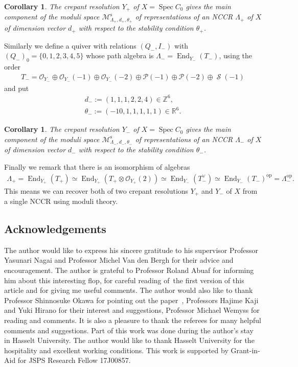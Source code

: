 \documentclass[10pt,a4paper]{amsart}
\DeclareMathOperator{\End}{End}
\DeclareMathOperator{\Spi}{\mathcal{S}}
\DeclareMathOperator{\Spec}{Spec}
\newcommand{\stsh}{\mathcal{O}}
\numberwithin{equation}{section}
\newtheorem{Corollary}[Theorem]{Corollary}
\begin{document}
\begin{Corollary}
The crepant resolution $Y_+$ of $X = \Spec C_0$ gives the main component of the moduli space $\mathcal{M}_{\Lambda_+, d_+, \theta_+}^{\mathrm{s}}$
of representations of an NCCR $\Lambda_+$ of $X$ of dimension vector $d_+$ with respect to the stability condition $\theta_+$.
\end{Corollary}

Similarly we define a quiver with relations $(Q_-, I_-)$ with $(Q_-)_0 = \{0,1,2,3,4,5\}$
whose path algebra is $\Lambda_- = \End_{Y_-}(T_-)$,
using the order
\begin{gather*}
T_- = \stsh_{Y_-} \oplus \stsh_{Y_-}(-1) \oplus \stsh_{Y_-}(-2) \oplus \mathcal{P}(-1) \oplus \mathcal{P}(-2) \oplus \Spi(-1)
\end{gather*}
and put
\begin{gather*}
d_- := (1,1,1,2 , 2, 4) \in \mathbb{Z}^{6}, \\
\theta_- := (-10, 1,1,1,1,1) \in \mathbb{R}^{6}.
\end{gather*}

\begin{Corollary}
The crepant resolution $Y_-$ of $X = \Spec C_0$ gives the main component of the moduli space $\mathcal{M}_{\Lambda_-, d_-, \theta_-}^{\mathrm{s}}$
of representations of an NCCR $\Lambda_-$ of $X$ of dimension vector $d_-$ with respect to the stability condition $\theta_-$.
\end{Corollary}

Finally we remark that there is an isomorphism of algebras
\begin{align*}
\Lambda_+ = \End_{Y_+}(T_+) \simeq \End_{Y_+}(T_+ \otimes \stsh_{Y_+}(2)) \simeq \End_{Y_-}(T_-^{\vee}) \simeq \End_{Y_-}(T_-)^{\mathrm{op}} = \Lambda_-^{\mathrm{op}}.
\end{align*}
This means we can recover both of two crepant resolutions $Y_+$ and $Y_-$ of $X$ from a single NCCR using moduli theory.

\subsection*{Acknowledgements}
The author would like to express his sincere gratitude to his supervisor Professor Yasunari Nagai and Professor Michel Van den Bergh
for their advice and encouragement.
The author is grateful to Professor Roland Abuaf for informing him about this interesting flop, for careful reading of~the first version of this article and for giving me useful comments.
The author would also like to thank Professor Shinnosuke Okawa for pointing out the paper~\cite{Ued16},
Professors Hajime Kaji and Yuki Hirano for their interest and suggestions,
Professor Michael Wemyss for reading and comments.
It is also a pleasure to thank the referees for many helpful comments and suggestions.
Part of this work was done during the author's stay in Hasselt University.
The author would like to thank Hasselt University for the hospitality and excellent working conditions.
This work is supported by Grant-in-Aid for JSPS Research Fellow 17J00857.
\end{document}
